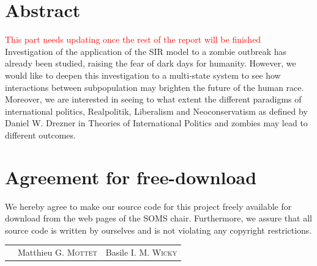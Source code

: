 \documentclass[11pt]{article} %
\begin{document}



\newpage

\section*{Abstract}\indent
\textcolor{red} {This part needs updating once the rest of the report will be finished}\\
Investigation of the application of the SIR model to a zombie outbreak has already been studied, raising the fear of dark days for humanity. However, we would like to deepen this investigation to a multi-state system to see how interactions between subpopulation may brighten the future of the human race. Moreover, we are interested in seeing to what extent the different paradigms of international politics, Realpolitik, Liberalism and Neoconservatism as defined by Daniel W. Drezner in Theories of International Politics and zombies may lead to different outcomes.




\newpage
\section*{Agreement for free-download} %

\bigskip
\bigskip

\large We hereby agree to make our source code for this project freely available for download from the web pages of the SOMS chair. Furthermore, we assure that all source code is written by ourselves and is not violating any copyright restrictions.

\begin{center}

\bigskip
\bigskip

\begin{tabular}{@{}p{2cm}@{}p{6cm}@{}@{}p{6cm}@{}}
\begin{minipage}{3.3cm}
\end{minipage}
&
\begin{minipage}{6cm}
\vspace{3cm} \large{Matthieu G. \textsc{Mottet}}

\vspace{\baselineskip}

\end{minipage}
&
\begin{minipage}{6cm}

\vspace{3cm}\large{Basile I. M. \textsc{Wicky}}
\vspace{\baselineskip}
\end{minipage}
\end{tabular}


\end{center}
\newpage
\end{document}
